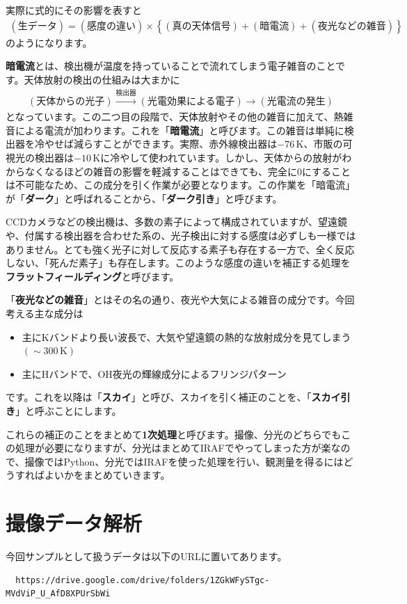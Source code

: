 実際に式的にその影響を表すと
\begin{align}
  (\text{生データ}) =  (\text{感度の違い}) \times \left\{  (\text{真の天体信号})+(\text{暗電流})+(夜光などの雑音) \right\}\label{eq:nama_data}
\end{align}
のようになります。\par
\textbf{暗電流}とは、検出機が温度を持っていることで流れてしまう電子雑音のことです。天体放射の検出の仕組みは大まかに
\begin{align*}
  (\text{天体からの光子}) \xrightarrow{\text{検出器}} (\text{光電効果による電子}) \rightarrow (\text{光電流の発生})
\end{align*}
となっています。この二つ目の段階で、天体放射やその他の雑音に加えて、熱雑音による電流が加わります。これを「\textbf{暗電流}」と呼びます。この雑音は単純に検出器を冷やせば減らすことができます。実際、赤外線検出器は$-76\,\mathrm{K}$、市販の可視光の検出器は$-10\,\mathrm{K}$に冷やして使われています。しかし、天体からの放射がわからなくなるほどの雑音の影響を軽減することはできても、完全に$0$にすることは不可能なため、この成分を引く作業が必要となります。この作業を「暗電流」が「\textbf{ダーク}」と呼ばれることから、「\textbf{ダーク引き}」と呼びます。\par
CCDカメラなどの検出機は、多数の素子によって構成されていますが、望遠鏡や、付属する検出器を合わせた系の、光子検出に対する感度は必ずしも一様ではありません。とても強く光子に対して反応する素子も存在する一方で、全く反応しない、「死んだ素子」も存在します。このような感度の違いを補正する処理を\textbf{フラットフィールディング}と呼びます。\par
「\textbf{夜光などの雑音}」とはその名の通り、夜光や大気による雑音の成分です。今回考える主な成分は
\begin{itemize}
  \item 主にKバンドより長い波長で、大気や望遠鏡の熱的な放射成分を見てしまう$(\sim300\,\mathrm{K})$
  \item 主にHバンドで、OH夜光の輝線成分によるフリンジパターン
\end{itemize}
です。これを以降は「\textbf{スカイ}」と呼び、スカイを引く補正のことを、「\textbf{スカイ引き}」と呼ぶことにします。\par
これらの補正のことをまとめて\textbf{1次処理}と呼びます。撮像、分光のどちらでもこの処理が必要になりますが、分光はまとめてIRAFでやってしまった方が楽なので、撮像ではPython、分光ではIRAFを使った処理を行い、観測量を得るにはどうすればよいかをまとめていきます。

\section{撮像データ解析} %
\label{sect:photo_ana}
今回サンプルとして扱うデータは以下のURLに置いてあります。
\begin{verbatim}
  https://drive.google.com/drive/folders/1ZGkWFySTgc-MVdViP_U_AfD8XPUrSbWi
\end{verbatim}

